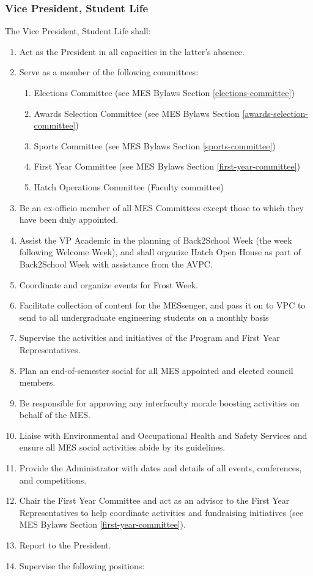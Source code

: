 \hypertarget{vice-president-student-life}{%
 \subsubsection{Vice President, Student
  Life}
 \label{vice-president-student-life}}
The Vice President, Student Life shall:

\begin{enumerate}
 \item
  Act as the President in all capacities in the latter's absence.
 \item
  Serve as a member of the following committees:

  \begin{enumerate}
   \item
    Elections Committee (see MES Bylaws Section \ref{elections-committee})
   \item
    Awards Selection Committee (see MES Bylaws Section \ref{awards-selection-committee})
   \item
    Sports Committee (see MES Bylaws Section \ref{sports-committee})
   \item
    First Year Committee (see MES Bylaws Section \ref{first-year-committee})
   \item
    Hatch Operations Committee (Faculty committee)
  \end{enumerate}
 \item
  Be an ex-officio member of all MES Committees except those to which
  they have been duly appointed.
 \item
  Assist the VP Academic in the planning of Back2School Week (the week
  following Welcome Week), and shall organize Hatch Open House as part
  of Back2School Week with assistance from the AVPC.
 \item
  Coordinate and organize events for Frost Week.
 \item
  Facilitate collection of content for the MESsenger, and pass it on to
  VPC to send to all undergraduate engineering students on a monthly
  basis
 \item
  Supervise the activities and initiatives of the Program and First Year
  Representatives.
 \item
  Plan an end-of-semester social for all MES appointed and elected
  council members.
 \item
  Be responsible for approving any interfaculty morale boosting
  activities on behalf of the MES.
 \item
  Liaise with Environmental and Occupational Health and Safety Services
  and ensure all MES social activities abide by its guidelines.
 \item
  Provide the Administrator with dates and details of all events,
  conferences, and competitions.
 \item
  Chair the First Year Committee and act as an advisor to the First Year
  Representatives to help coordinate activities and fundraising
  initiatives (see MES Bylaws Section \ref{first-year-committee}).
 \item
  Report to the President.
 \item
  Supervise the following positions:


\end{enumerate}
